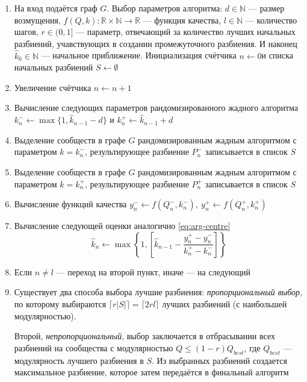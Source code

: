 \begin{enumerate}
	\item На вход подаётся граф $G$. Выбор параметров алгоритма: $d \in \mathbb{N}$ --- размер возмущения, $f(Q, k): \mathbb{R} \times \mathbb{N} \rightarrow \mathbb{R}$ --- функция качества, $l \in \mathbb{N}$ --- количество шагов, $r \in (0, 1]$ --- параметр, отвечающий за количество лучших начальных разбиений, учавствующих в создании промежуточного разбиения. И наконец $\hat{k}_0 \in \mathbb{N}$ --- начальное приближение. Инициализация счётчика $n \leftarrow 0$и списка начальных разбиений $S \leftarrow \emptyset$
	\item Увеличение счётчика $n \leftarrow n + 1$
	\item \label{item:es-k+} Вычисление следующих параметров рандомизированного жадного алгоритма $k_n^{-} \leftarrow \max\{1, \hat{k}_{n - 1} - d\}$ и $k_n^{+} \leftarrow \hat{k}_{n - 1} + d$
	\item Выделение сообществ в графе $G$ рандомизированным жадным алгоритмом с параметром $k = k_n^{-}$, результирующее разбиение $P_n^{-}$ записывается в список $S$
	\item Выделение сообществ в графе $G$ рандомизированным жадным алгоритмом с параметром $k = k_n^{+}$, результирующее разбиение $P_n^{+}$ записывается в список $S$
	\item Вычисление функций качества $y_n^{-} \leftarrow f(Q_n^{-}, k_n^{-}),\ y_n^{+} \leftarrow f(Q_n^{+}, k_n^{+})$
	\item Вычисление следующей оценки аналогично \eqref{eq:arg-centre}
	\begin{equation}\label{eq:aes-centre}
		\hat{k}_n \leftarrow \max\left\{1, \left[\hat{k}_{n - 1} - \frac{y_n^{+} - y_n^{-}}{k_n^{+} - k_n^{-}}\right]\right\}
	\end{equation}
	\item Если $n \ne l$ --- переход на второй пункт, иначе --- на следующий
	\item Существует два способа выбора лучшие разбиения: \emph{пропорциональный выбор}, по которому выбираются $\lceil r|S| \rceil = \lceil 2rl \rceil$ лучших разбиений (с наибольшей модулярностью).

	Второй, \emph{непропорциональный}, выбор заключается в отбрасывании всех разбиений на сообщества с модулярностью $Q \le (1 - r)Q_{best}$, где $Q_{best}$ --- модулярность лучшего разбиения в $S$. Из выбранных разбиений создается максимальное разбиение, которое затем передаётся в финальный алгоритм
\end{enumerate}

